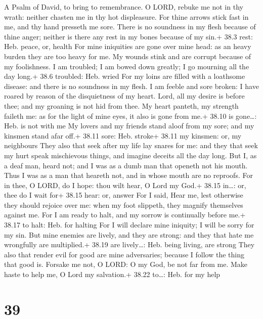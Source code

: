 A Psalm of David, to bring to remembrance.  O LORD, rebuke
me not in thy wrath: neither chasten me in thy hot displeasure.
 For thine arrows stick fast in me, and thy hand presseth me
sore.  There is no soundness in my flesh because of thine
anger; neither is there any rest in my bones because of my sin.+ 38.3
rest: Heb. peace, or, health  For mine iniquities are gone
over mine head: as an heavy burden they are too heavy for me.
 My wounds stink and are corrupt because of my foolishness.
 I am troubled; I am bowed down greatly; I go mourning all
the day long.+ 38.6 troubled: Heb. wried  For my loins are
filled with a loathsome disease: and there is no soundness in my flesh.
 I am feeble and sore broken: I have roared by reason of the
disquietness of my heart.  Lord, all my desire is before
thee; and my groaning is not hid from thee.  My heart
panteth, my strength faileth me: as for the light of mine eyes, it also
is gone from me.+ 38.10 is gone\ldots: Heb. is not with me 
My lovers and my friends stand aloof from my sore; and my kinsmen stand
afar off.+ 38.11 sore: Heb. stroke+ 38.11 my kinsmen: or, my neighbours
 They also that seek after my life lay snares for me: and
they that seek my hurt speak mischievous things, and imagine deceits all
the day long.  But I, as a deaf man, heard not; and I was
as a dumb man that openeth not his mouth.  Thus I was as a
man that heareth not, and in whose mouth are no reproofs. 
For in thee, O LORD, do I hope: thou wilt hear, O Lord my God.+ 38.15
in\ldots: or, thee do I wait for+ 38.15 hear: or, answer 
For I said, Hear me, lest otherwise they should rejoice over me: when my
foot slippeth, they magnify themselves against me.  For I
am ready to halt, and my sorrow is continually before me.+ 38.17 to
halt: Heb. for halting  For I will declare mine iniquity; I
will be sorry for my sin.  But mine enemies are lively, and
they are strong: and they that hate me wrongfully are multiplied.+ 38.19
are lively\ldots: Heb. being living, are strong  They also
that render evil for good are mine adversaries; because I follow the
thing that good is.  Forsake me not, O LORD: O my God, be
not far from me.  Make haste to help me, O Lord my
salvation.+ 38.22 to\ldots: Heb. for my help

\hypertarget{section-38}{%
\section{39}\label{section-38}}

